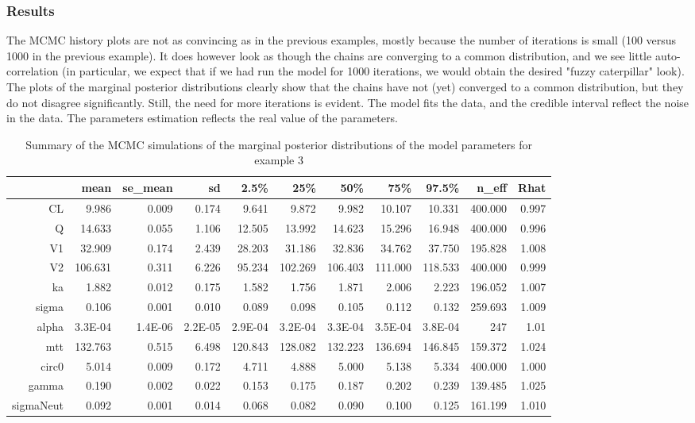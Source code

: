 \documentclass[11pt]{amsart}
\begin{document}
\subsubsection*{Results} The MCMC history plots are not as convincing as in the previous examples, mostly because the number of iterations is small (100 versus 1000 in the previous example). It does however look as though the chains are converging to a common distribution, and we see little auto-correlation (in particular, we  expect that if we had run the model for 1000 iterations, we would obtain the desired "fuzzy caterpillar" look). The plots of the marginal posterior distributions clearly show that the chains have not (yet) converged to a common distribution, but they do not disagree significantly. Still, the need for more iterations is evident. The model fits the data, and the credible interval reflect the noise in the data. The parameters estimation reflects the real value of the parameters.

{\tiny
\begin{table}[!htb]
\centering
\caption{Summary of the MCMC simulations of the marginal posterior distributions of the model parameters for example 3}
\begin{tabular}{rrrrrrrrrrr}
  \hline
 & mean & se\_mean & sd & 2.5\% & 25\% & 50\% & 75\% & 97.5\% & n\_eff & Rhat \\ 
  \hline
CL & 9.986 & 0.009 & 0.174 & 9.641 & 9.872 & 9.982 & 10.107 & 10.331 & 400.000 & 0.997 \\
Q & 14.633 & 0.055 & 1.106 & 12.505 & 13.992 & 14.623 & 15.296 & 16.948 & 400.000 & 0.996 \\
V1 & 32.909 & 0.174 & 2.439 & 28.203 & 31.186 & 32.836 & 34.762 & 37.750 & 195.828 & 1.008 \\
V2 & 106.631 & 0.311 & 6.226 & 95.234 & 102.269 & 106.403 & 111.000 & 118.533 & 400.000 & 0.999 \\
ka & 1.882 & 0.012 & 0.175 & 1.582 & 1.756 & 1.871 & 2.006 & 2.223 & 196.052 & 1.007 \\
sigma & 0.106 & 0.001 & 0.010 & 0.089 & 0.098 & 0.105 & 0.112 & 0.132 & 259.693 & 1.009 \\
alpha & 3.3E-04 & 1.4E-06 & 2.2E-05 & 2.9E-04 & 3.2E-04 & 3.3E-04 & 3.5E-04 & 3.8E-04 & 247 & 1.01 \\
mtt & 132.763 & 0.515 & 6.498 & 120.843 & 128.082 & 132.223 & 136.694 & 146.845 & 159.372 & 1.024 \\
circ0 & 5.014 & 0.009 & 0.172 & 4.711 & 4.888 & 5.000 & 5.138 & 5.334 & 400.000 & 1.000 \\
gamma & 0.190 & 0.002 & 0.022 & 0.153 & 0.175 & 0.187 & 0.202 & 0.239 & 139.485 & 1.025 \\
sigmaNeut & 0.092 & 0.001 & 0.014 & 0.068 & 0.082 & 0.090 & 0.100 & 0.125 & 161.199 & 1.010 \\
  \hline
\end{tabular}
\end{table} 
}
\end{document}
